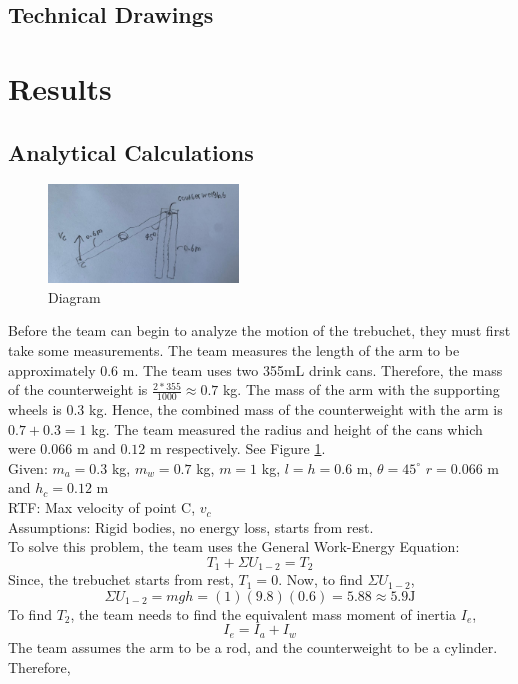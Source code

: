 \documentclass[12pt, titlepage]{article}
\begin{document}
    \subsection{Technical Drawings}
    \newpage
    \section{Results}
    \subsection{Analytical Calculations}
    \begin{figure}[b]                                  
    \centering
    \includegraphics[width=0.45\textwidth]{d1.jpeg}
    \caption{Diagram\label{d1}}
    \end{figure}
    Before the team can begin to analyze the motion of the trebuchet, they must
    first take some measurements. The team measures the length of the arm to be 
    approximately $0.6$ m. The team uses two 355mL drink cans.
    Therefore, the mass of the counterweight is $\frac{2*355}{1000} \approx 0.7$ kg.
    The mass of the arm with the supporting wheels is $0.3$ kg.
    Hence, the combined mass of the counterweight with the arm is 
    $0.7 + 0.3 = 1$ kg. The team measured the radius
    and height of the cans which were $0.066$ m and $0.12$ m respectively. See Figure \ref{d1}.\\[20pt]
    Given: $m_{a} = 0.3$ kg, $m_{w} = 0.7$ kg, $m = 1$ kg, $l = h = 0.6$ m, $\theta = 45^\circ$
    $r = 0.066$ m and $h_c = 0.12$ m\\
    RTF: Max velocity of point C, $v_c$\\
    Assumptions: Rigid bodies, no energy loss, starts from rest.\\[10pt]
    To solve this problem, the team uses the General Work-Energy Equation:
    $$T_1 + \Sigma U_{1-2} = T_2$$
    Since, the trebuchet starts from rest, $T_1 = 0$. Now, to find $\Sigma U_{1-2}$,
    $$\Sigma U_{1-2} = mgh = (1)(9.8)(0.6) = 5.88 \approx 5.9 \mathrm{J}$$
    To find $T_2$, the team needs to find the equivalent mass moment of inertia $I_e$,
    $$I_e = I_a + I_w$$
    \newpage
    \noindent The team assumes the arm to be a rod, and the counterweight to be a cylinder. Therefore,
\end{document}
